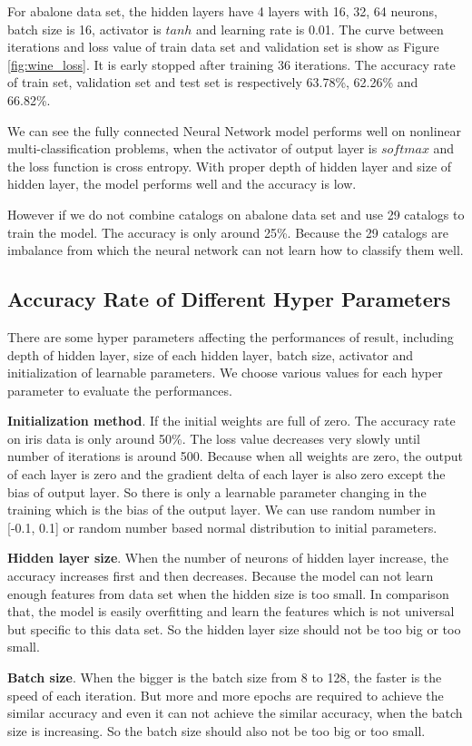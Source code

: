 For abalone data set, the hidden layers have 4 layers with 16, 32, 64 neurons, batch size is 16, activator is \(tanh\) and learning rate is 0.01. The curve between iterations and loss value of train data set and validation set is show as Figure \ref{fig:wine_loss}. It is early stopped after training 36 iterations. The accuracy rate of train set, validation set and test set is respectively 63.78\%, 62.26\% and 66.82\%.

We can see the fully connected Neural Network model performs well on nonlinear multi-classification problems, when the activator of output layer is \(softmax\) and the loss function is cross entropy. With proper depth of hidden layer and size of hidden layer, the model performs well and the accuracy is low.

However if we do not combine catalogs on abalone data set and use 29 catalogs to train the model. The accuracy is only around 25\%. Because the 29 catalogs are imbalance from which the neural network can not learn how to classify them well.

\subsection{Accuracy Rate of Different Hyper Parameters}
There are some hyper parameters affecting the performances of result, including depth of hidden layer, size of each hidden layer, batch size, activator and initialization of learnable parameters. We choose various values for each hyper parameter to evaluate the performances.

\textbf{Initialization method}. If the initial weights are full of zero. The accuracy rate on iris data is only around 50\%. The loss value decreases very slowly until number of iterations is around 500. Because when all weights are zero, the output of each layer is zero and the gradient delta of each layer is also zero except the  bias of output layer. So there is only a learnable parameter changing in the training which is the bias of the output layer. We can use random number in [-0.1, 0.1] or random number based normal distribution to initial parameters.

\textbf{Hidden layer size}. When the number of neurons of hidden layer increase, the accuracy increases first and then decreases. Because the model can not learn enough features from data set when the hidden size is too small. In comparison that, the model is easily overfitting and learn the features which is not universal but specific to this data set. So the hidden layer size should not be too big or too small.

\textbf{Batch size}.
When the bigger is the batch size from 8 to 128, the faster is the speed of each iteration. But more and more epochs are required to achieve the similar accuracy and even it can not achieve the similar accuracy, when the batch size is increasing. So the batch size should also not be too big or too small.
